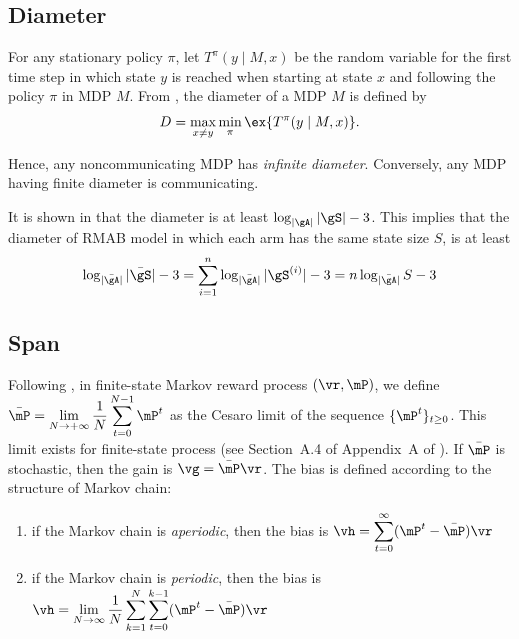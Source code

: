 \subsection{Diameter}

For any stationary policy $\pi$, let $T^\pi(y \mid M, x)$ be the random variable for the first time step in which state $y$ is reached when starting at state $x$ and following the policy $\pi$ in MDP $M$.
From \cite[Definition 1]{jaksch2010near}, the diameter of a MDP $M$ is defined by
\begin{align*}
    D = \max_{x\neq y}\min_{\pi} \ex{T^\pi(y\mid M, x)}.
\end{align*}

Hence, any noncommunicating MDP has \emph{infinite diameter}. Conversely, any MDP having finite diameter is communicating.

It is shown in \cite[Appendix A]{jaksch2010near} that the diameter is at least $\log_{|\gA|}|\gS|-3$.
This implies that the diameter of RMAB model in which each arm has the same state size $S$, is at least
\begin{equation*}
    \log_{|\bar{\gA}|}|\bar{\gS}| -3 = \sum_{i=1}^{n}\log_{|\bar{\gA}|}|\gS^{(i)}| -3 =n\log_{|\bar{\gA}|}S -3
\end{equation*}

\subsection{Span}


Following \cite[Chapter~8]{puterman2014markov}, in finite-state Markov reward process $(\vr, \mP)$, we define $\bar{\mP}=\displaystyle\lim_{N\to+\infty}\frac1N\sum_{t=0}^{N-1}\mP^{t}$ as the Cesaro limit of the sequence $\{\mP^t\}_{t\ge0}$.
This limit exists for finite-state process (see Section~A.4 of Appendix~A of \cite{puterman2014markov}).
If $\bar{\mP}$ is stochastic, then the gain is $\vg=\bar{\mP}\vr$.
The bias is defined according to the structure of Markov chain:
\begin{enumerate}
    \item if the Markov chain is \emph{aperiodic}, then the bias is $\vh=\displaystyle\sum_{t=0}^\infty(\mP^t-\bar{\mP})\vr$
    \item if the Markov chain is \emph{periodic}, then the bias is $\vh=\displaystyle\lim_{N\to\infty}\frac1N\sum_{k=1}^N\sum_{t=0}^{k-1}(\mP^t-\bar{\mP})\vr$
\end{enumerate}

